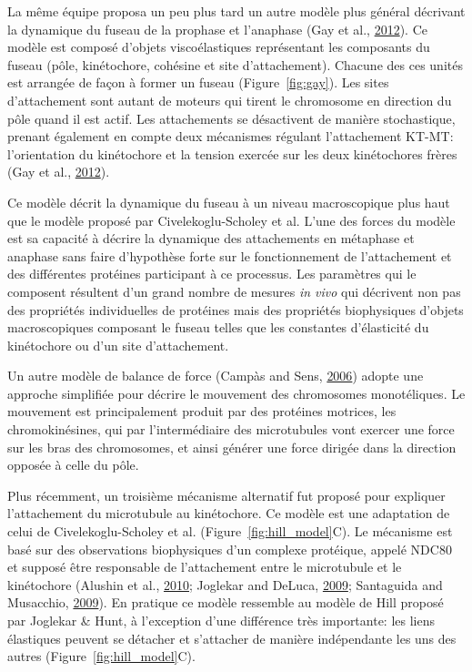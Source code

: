 \documentclass[12pt,a4paper,twoside,openright]{book}
\begin{document}
La même équipe proposa un peu plus tard un autre modèle plus général
décrivant la dynamique du fuseau de la prophase et l'anaphase (Gay et
al., \hyperref[ref-Gay2012a]{2012}). Ce modèle est composé d'objets
viscoélastiques représentant les composants du fuseau (pôle,
kinétochore, cohésine et site d'attachement). Chacune des ces unités est
arrangée de façon à former un fuseau (Figure~\ref{fig:gay}). Les sites
d'attachement sont autant de moteurs qui tirent le chromosome en
direction du pôle quand il est actif. Les attachements se désactivent de
manière stochastique, prenant également en compte deux mécanismes
régulant l'attachement KT-MT: l'orientation du kinétochore et la tension
exercée sur les deux kinétochores frères (Gay et al.,
\hyperref[ref-Gay2012a]{2012}).

Ce modèle décrit la dynamique du fuseau à un niveau macroscopique plus
haut que le modèle proposé par Civelekoglu-Scholey et al. L'une des
forces du modèle est sa capacité à décrire la dynamique des attachements
en métaphase et anaphase sans faire d'hypothèse forte sur le
fonctionnement de l'attachement et des différentes protéines participant
à ce processus. Les paramètres qui le composent résultent d'un grand
nombre de mesures \emph{in vivo} qui décrivent non pas des propriétés
individuelles de protéines mais des propriétés biophysiques d'objets
macroscopiques composant le fuseau telles que les constantes
d'élasticité du kinétochore ou d'un site d'attachement.

Un autre modèle de balance de force (Campàs and Sens,
\hyperref[ref-Campas2006]{2006}) adopte une approche simplifiée pour
décrire le mouvement des chromosomes monotéliques. Le mouvement est
principalement produit par des protéines motrices, les chromokinésines,
qui par l'intermédiaire des microtubules vont exercer une force sur les
bras des chromosomes, et ainsi générer une force dirigée dans la
direction opposée à celle du pôle.

Plus récemment, un troisième mécanisme alternatif fut proposé pour
expliquer l'attachement du microtubule au kinétochore. Ce modèle est une
adaptation de celui de Civelekoglu-Scholey et al.
(Figure~\ref{fig:hill_model}C). Le mécanisme est basé sur des
observations biophysiques d'un complexe protéique, appelé NDC80 et
supposé être responsable de l'attachement entre le microtubule et le
kinétochore (Alushin et al., \hyperref[ref-Alushin2010]{2010}; Joglekar
and DeLuca, \hyperref[ref-Joglekar2009]{2009}; Santaguida and Musacchio,
\hyperref[ref-Santaguida2009a]{2009}). En pratique ce modèle ressemble
au modèle de Hill proposé par Joglekar \& Hunt, à l'exception d'une
différence très importante: les liens élastiques peuvent se détacher et
s'attacher de manière indépendante les uns des autres
(Figure~\ref{fig:hill_model}C).
\end{document}
